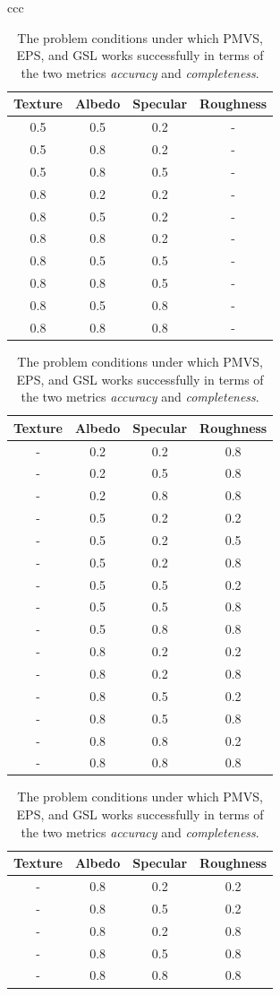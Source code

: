 \begin{table}
\centering
\begin{tabular}{ccc}
\begin{tabular}{*{4}{c}}
\toprule
Texture & Albedo & Specular & Roughness\\
\midrule
0.5 & 0.5 & 0.2 & -\\
0.5 & 0.8 & 0.2 & -\\
0.5 & 0.8 & 0.5 & -\\
0.8 & 0.2 & 0.2 & -\\
0.8 & 0.5 & 0.2 & -\\
0.8 & 0.8 & 0.2 & -\\
0.8 & 0.5 & 0.5 & -\\
0.8 & 0.8 & 0.5 & -\\
0.8 & 0.5 & 0.8 & -\\
0.8 & 0.8 & 0.8 & -\\
\bottomrule
\end{tabular}

\begin{tabular}{*{4}{c}}
\toprule
Texture & Albedo & Specular & Roughness\\
\midrule
- & 0.2 & 0.2 & 0.8\\
- & 0.2 & 0.5 & 0.8\\
- & 0.2 & 0.8 & 0.8\\
- & 0.5 & 0.2 & 0.2\\
- & 0.5 & 0.2 & 0.5\\
- & 0.5 & 0.2 & 0.8\\
- & 0.5 & 0.5 & 0.2\\
- & 0.5 & 0.5 & 0.8\\
- & 0.5 & 0.8 & 0.8\\
- & 0.8 & 0.2 & 0.2\\ %
- & 0.8 & 0.2 & 0.8\\
- & 0.8 & 0.5 & 0.2\\
- & 0.8 & 0.5 & 0.8\\
- & 0.8 & 0.8 & 0.2\\ %
- & 0.8 & 0.8 & 0.8\\
\bottomrule
\end{tabular}

\begin{tabular}{*{4}{c}}
\toprule
Texture & Albedo & Specular & Roughness\\
\midrule
- & 0.8 & 0.2 & 0.2\\
- & 0.8 & 0.5 & 0.2\\
- & 0.8 & 0.2 & 0.8\\
- & 0.8 & 0.5 & 0.8\\
- & 0.8 & 0.8 & 0.8\\
\bottomrule
\end{tabular}

\end{tabular}
\caption{The problem conditions under which PMVS, EPS, and GSL works successfully in terms of the two metrics \textit{accuracy} and \textit{completeness}.}
\label{tab:training_result}
\end{table}

